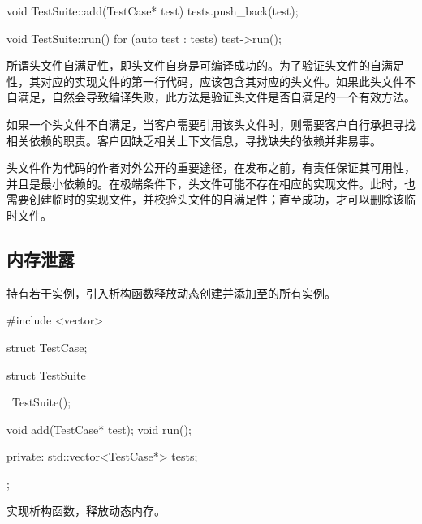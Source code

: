 \begin{content}
\begin{leftbar}
\begin{c++}[caption={\ttfamily{src/mars/core/TestSuite.cc}}]
void TestSuite::add(TestCase* test) {
  tests.push_back(test);
}

void TestSuite::run() {
  for (auto test : tests) {
    test->run();
  }
}
 \end{c++}
\end{leftbar}

\begin{story}
  \begin{center}
  \end{center}

\begin{content}

所谓头文件自满足性，即头文件自身是可编译成功的。为了验证头文件的自满足性，其对应的实现文件的第一行代码，应该包含其对应的头文件。如果此头文件不自满足，自然会导致编译失败，此方法是验证头文件是否自满足的一个有效方法。

如果一个头文件不自满足，当客户需要引用该头文件时，则需要客户自行承担寻找相关依赖的职责。客户因缺乏相关上下文信息，寻找缺失的依赖并非易事。

头文件作为代码的作者对外公开的重要途径，在发布之前，有责任保证其可用性，并且是最小依赖的。在极端条件下，头文件可能不存在相应的实现文件。此时，也需要创建临时的实现文件，并校验头文件的自满足性；直至成功，才可以删除该临时文件。

\end{content}

\end{story}

\subsection{内存泄露}

持有若干实例，引入析构函数释放动态创建并添加至的所有实例。

\begin{leftbar}
 \begin{c++}[caption={\ttfamily{include/mars/core/TestSuite.h}}]
#include <vector>

struct TestCase;

struct TestSuite {
  ~TestSuite();

  void add(TestCase* test);
  void run();

private:
  std::vector<TestCase*> tests;
};
 \end{c++}
\end{leftbar}

实现析构函数，释放动态内存。


\end{content}
